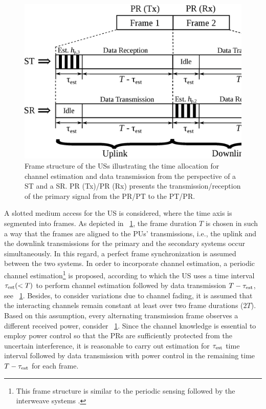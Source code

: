 \begin{figure}[!t]
\centering
\includegraphics[width = \columnwidth]{figures/Frame_Structure}
\caption{Frame structure of the USs illustrating the time allocation for channel estimation and data transmission from the perspective of a ST and a SR. %
PR (Tx)/PR (Rx) presents the transmission/reception of the primary signal from the PR/PT to the PT/PR.} 
\label{fig_US:fs}
\end{figure}



A slotted medium access for the US is considered, where the time axis is segmented into frames. As depicted in \figurename~\ref{fig_US:fs}, the frame duration $T$ is chosen in such a way that the frames are aligned to the PUs' transmissions, i.e., the uplink and the downlink transmissions for the primary and the secondary systems occur simultaneously. In this regard, a perfect frame synchronization is assumed between the two systems. In order to incorporate channel estimation, a periodic channel estimation\footnote{This frame structure is similar to the periodic sensing followed by the interweave systems \cite{Liang08}.} is proposed, according to which the US uses a time interval $\tau_{\text{est}} (< T)$ to perform channel estimation followed by data transmission $T- \tau_{\text{est}}$, see \figurename~\ref{fig_US:fs}. Besides, to consider variations due to channel fading, it is assumed that the interacting channels remain constant at least over two frame durations ($2T$). Based on this assumption, every alternating transmission frame observes a different received power, consider \figurename~\ref{fig_US:fs}. Since the channel knowledge is essential to employ power control so that the PRs are sufficiently protected from the uncertain interference, it is reasonable to carry out estimation for $\tau_{\text{est}}$ time interval followed by data transmission with power control in the remaining time $T - \tau_{\text{est}}$ for each frame. %

